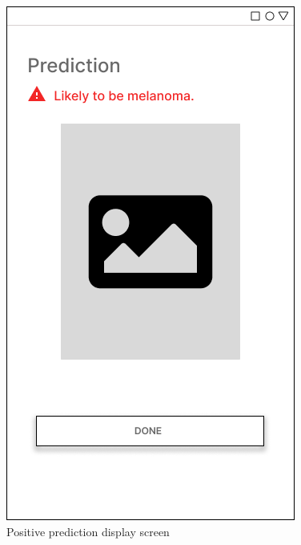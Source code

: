 \documentclass[12pt, a4paper]{article}
\begin{document}
\begin{figure}[h]
    \centering
    \setlength{\fboxsep}{8pt}
    \includegraphics[scale=0.45, fbox]{Prediction-1.png}
    \caption{Positive prediction display screen}
    \label{fig:prediction-1}
\end{figure}
\end{document}

